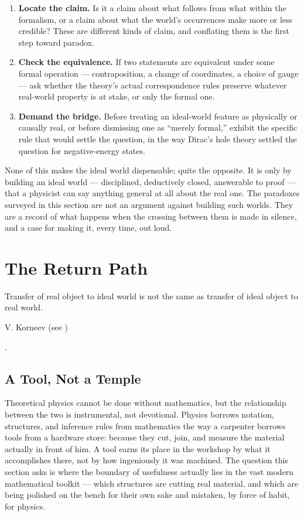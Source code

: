 \begin{enumerate}
    \item \textbf{Locate the claim.} Is it a claim about what follows from what
        within the formalism, or a claim about what the world's occurrences
        make more or less credible? These are different kinds of claim, and
        conflating them is the first step toward paradox.
    \item \textbf{Check the equivalence.} If two statements are equivalent
        under some formal operation --- contraposition, a change of
        coordinates, a choice of gauge --- ask whether the theory's actual
        correspondence rules preserve whatever real-world property is at stake,
        or only the formal one.
    \item \textbf{Demand the bridge.} Before treating an ideal-world feature as
        physically or causally real, or before dismissing one as ``merely
        formal,'' exhibit the specific rule that would settle the question, in
        the way Dirac's hole theory settled the question for negative-energy
        states.
\end{enumerate}

None of this makes the ideal world dispensable; quite the opposite. It is only
by building an ideal world --- disciplined, deductively closed, answerable to
proof --- that a physicist can say anything general at all about the real one.
The paradoxes surveyed in this section are not an argument against building
such worlds. They are a record of what happens when the crossing between them
is made in silence, and a case for making it, every time, out loud.
  

\section{The Return Path}
\epigraph{Transfer of real object to ideal world
is not the same as transfer of ideal object to real world.}
{ V. Korneev (see \cite{strugatsky})}.

\subsection{A Tool, Not a Temple}

Theoretical physics cannot be done without mathematics, but the relationship
between the two is instrumental, not devotional. Physics borrows notation,
structures, and inference rules from mathematics the way a carpenter borrows
tools from a hardware store: because they cut, join, and measure the material
actually in front of him. A tool earns its place in the workshop by what it
accomplishes there, not by how ingeniously it was machined. The question this
section asks is where the boundary of usefulness actually lies in the vast
modern mathematical toolkit --- which structures are cutting real material, and
which are being polished on the bench for their own sake and mistaken, by force
of habit, for physics.

